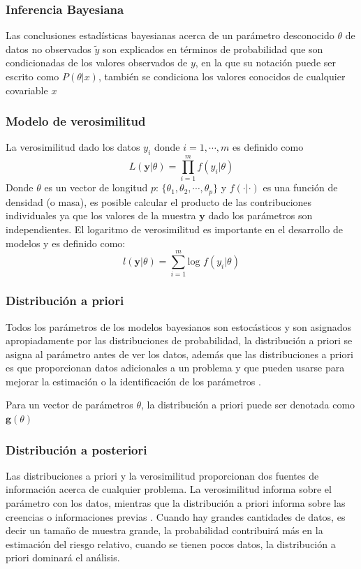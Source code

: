 \subsubsection{Inferencia Bayesiana}
Las conclusiones estadísticas bayesianas acerca de un parámetro desconocido $\theta$ de datos no observados $\tilde{y}$ son explicados en términos de probabilidad que son condicionadas de los valores observados de $y$, en la que su notación puede ser escrito como $P(\theta | x)$, también se condiciona los valores conocidos de cualquier covariable $x$ \cite{gelman1995bayesian}

\subsubsection{Modelo de verosimilitud}\cite{lawson2018bayesian}
La verosimilitud dado los datos $y_i$ donde $i = 1, \cdots, m$ es definido como
$$
L(\mathbf{y}|\theta) = \prod\limits_{i = 1}^{m}f({y}_{i}|\theta)
$$
Donde $\theta$ es un vector de longitud $p$: $\{ {\theta}_{1}, {\theta}_{2}, \cdots , {\theta}_{p} \}$ y $f(\cdot | \cdot)$ es una función de densidad (o masa), es posible calcular el producto de las contribuciones individuales ya que los valores de la muestra $\mathbf{y}$ dado los parámetros son independientes. El logaritmo de verosimilitud es importante en el desarrollo de modelos y es definido como:
$$
l(\mathbf{y}| \theta) = \sum\limits_{i = 1}^{m}\text{log }f({y}_{i}| \theta)
$$

\subsubsection{Distribución a priori}
Todos los parámetros de los modelos bayesianos son estocásticos y son asignados apropiadamente por las distribuciones de probabilidad, la distribución a priori se asigna al parámetro antes de ver los datos, además que las distribuciones a priori es que proporcionan datos adicionales a un problema y que pueden usarse para mejorar la estimación o la identificación de los parámetros \cite{lawson2018bayesian}.

Para un vector de parámetros $\theta$, la distribución a priori puede ser denotada como $\mathbf{g}(\theta)$

\subsubsection{Distribución a posteriori}
Las distribuciones a priori y la verosimilitud proporcionan dos fuentes de información acerca de cualquier problema. La verosimilitud informa sobre el parámetro con los datos, mientras que la distribución a priori informa sobre las creencias o informaciones previas \cite{lawson2018bayesian}. Cuando hay grandes cantidades de datos, es decir un tamaño de muestra grande, la probabilidad contribuirá más en la estimación del riesgo relativo, cuando se tienen pocos datos, la distribución a priori dominará el análisis.

